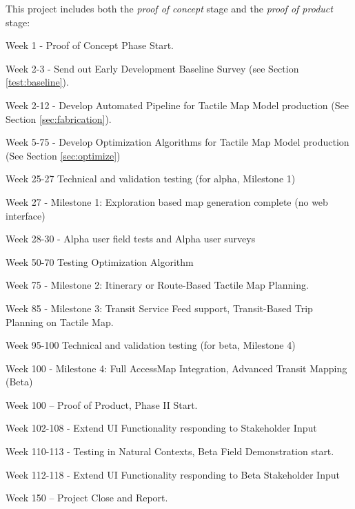 \label{sec:workplan}
\begin{comment}
Link this back to the Proof of Concept and Proof of Product discussions above. 
Name the specific Work Products of each and milestones. Give final Gantt chart.

The Work Plan should cover all three (3) years of the project period. The Work Plan should include a statement of the project's overall goal(s), anticipated outcome(s), and the major tasks that are proposed to achieve the goal and outcome(s). For each major task, the work plan should identify timeframes involved and the lead person responsible for the task.

NOTE : Applicants requesting funding for a multi-year grant program are REQUIRED to provide a Project Work Plan for EACH potential year of grant funding requested.
Goal:
\end{comment}


This project includes both the \textit{proof of concept} stage and the \textit{proof of product} stage:
\begin{description}
\item Week 1 - Proof of Concept Phase Start. 
\item Week 2-3 - Send out Early Development Baseline Survey (see Section \ref{test:baseline}).
\item Week 2-12 - Develop Automated Pipeline for Tactile Map Model production (See Section \ref{sec:fabrication}).
\item Week 5-75 - Develop Optimization Algorithms for Tactile Map Model production (See Section \ref{sec:optimize})
\item Week 25-27 Technical and validation testing (for alpha, Milestone 1)
\item Week 27 - Milestone 1: Exploration based map generation complete (no web interface)
\item Week 28-30 - Alpha user field tests and Alpha user surveys
\item Week 50-70 Testing Optimization Algorithm
\item Week 75 - Milestone 2: Itinerary or Route-Based Tactile Map Planning.
\item Week 85 - Milestone 3: Transit Service Feed support, Transit-Based Trip Planning on Tactile Map.
\item Week 95-100 Technical and validation testing (for beta, Milestone 4)
\item Week 100 - Milestone 4: Full AccessMap Integration, Advanced Transit Mapping (Beta)
\item Week 100 – Proof of Product, Phase II Start. 
\item Week 102-108 - Extend UI Functionality responding to Stakeholder Input
\item Week 110-113 - Testing in Natural Contexts, Beta Field Demonstration start.
\item Week 112-118 - Extend UI Functionality responding to Beta Stakeholder Input
\item Week 150 – Project Close and Report.

\end{description}

